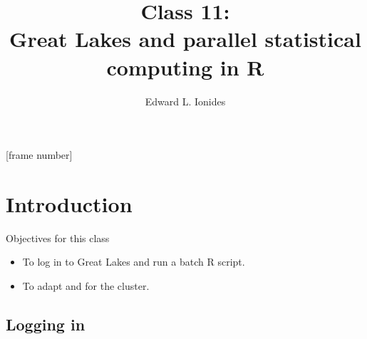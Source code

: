 



\def\CHAPTER{11}
\title{Class \CHAPTER:\\Great Lakes and parallel statistical computing in R}
\author{Edward L. Ionides}

[frame number]






\maketitle



\section{Introduction}

\begin{frame}{Objectives for this class}
  \begin{itemize}
  \item To log in to Great Lakes and run a batch R script.  
  \item To adapt  and  for the cluster.  
  \end{itemize}
\end{frame}

\subsection{Logging in}


